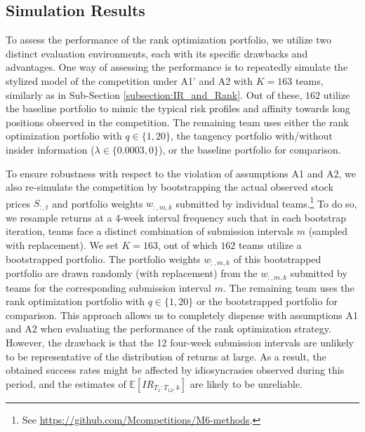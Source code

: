 \documentclass[3p,times,twocolumn]{elsarticle}
\begin{document}
\subsection{Simulation Results}

To assess the performance of the rank optimization portfolio, we utilize two distinct evaluation environments, each with its specific drawbacks and advantages.
One way of assessing the performance is to repeatedly simulate the stylized model of the competition under A1' and A2 with $K=163$ teams, similarly as in Sub-Section \ref{subsection:IR_and_Rank}.
Out of these, $162$ utilize the baseline portfolio to mimic the typical risk profiles and affinity towards long positions observed in the competition.
The remaining team uses either the rank optimization portfolio with $q \in \{1, 20\}$, the tangency portfolio with/without insider information ($\lambda \in \{0.0003, 0\}$), or the baseline portfolio for comparison.

To ensure robustness with respect to the violation of assumptions A1 and A2, we also re-simulate the competition by bootstrapping the actual observed stock prices $S_{:,t}$ and portfolio weights $w_{:,m,k}$ submitted by individual teams.\footnote{
    See \url{https://github.com/Mcompetitions/M6-methods}.
}
To do so, we resample returns at a 4-week interval frequency such that in each bootstrap iteration, teams face a distinct combination of submission intervals $m$ (sampled with replacement).
We set $K=163$, out of which $162$ teams utilize a bootstrapped portfolio.
The portfolio weights $w_{:,m,k}$ of this bootstrapped portfolio are drawn randomly (with replacement) from the $w_{:,m,k}$ submitted by teams for the corresponding submission interval $m$.
The remaining team uses the rank optimization portfolio with $q\in\{1,20\}$ or the bootstrapped portfolio for comparison.
This approach allows us to completely dispense with assumptions A1 and A2 when evaluating the performance of the rank optimization strategy.
However, the drawback is that the 12 four-week submission intervals are unlikely to be representative of the distribution of returns at large.
As a result, the obtained success rates might be affected by idiosyncrasies observed during this period, and the estimates of $\mathbb{E}[IR_{T_{1}:T_{12},k}]$ are likely to be unreliable.
\end{document}
